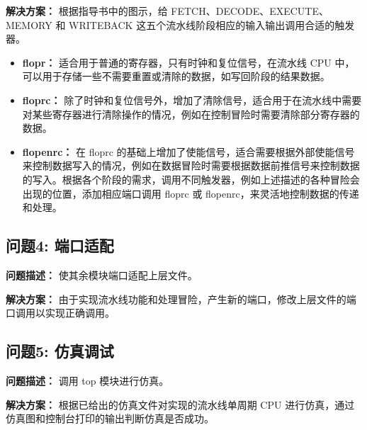 \textbf{解决方案：}
根据指导书中的图示，给 FETCH、DECODE、EXECUTE、MEMORY 和 WRITEBACK 这五个流水线阶段相应的输入输出调用合适的触发器。
\begin{itemize}
    \item \textbf{flopr：} 适合用于普通的寄存器，只有时钟和复位信号，在流水线 CPU 中，可以用于存储一些不需要重置或清除的数据，如写回阶段的结果数据。
    \item \textbf{floprc：} 除了时钟和复位信号外，增加了清除信号，适合用于在流水线中需要对某些寄存器进行清除操作的情况，例如在控制冒险时需要清除部分寄存器的数据。
    \item \textbf{flopenrc：} 在 floprc 的基础上增加了使能信号，适合需要根据外部使能信号来控制数据写入的情况，例如在数据冒险时需要根据数据前推信号来控制数据的写入。根据各个阶段的需求，调用不同触发器，例如上述描述的各种冒险会出现的位置，添加相应端口调用 floprc 或 flopenrc，来灵活地控制数据的传递和处理。
\end{itemize}

\subsection{问题4: 端口适配}
\textbf{问题描述：} 使其余模块端口适配上层文件。

\textbf{解决方案：} 由于实现流水线功能和处理冒险，产生新的端口，修改上层文件的端口调用以实现正确调用。

\subsection{问题5: 仿真调试}
\textbf{问题描述：} 调用 top 模块进行仿真。

\textbf{解决方案：} 根据已给出的仿真文件对实现的流水线单周期 CPU 进行仿真，通过仿真图和控制台打印的输出判断仿真是否成功。